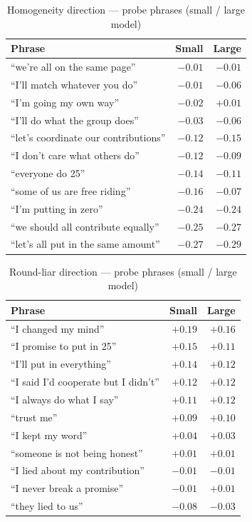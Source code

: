 \documentclass[11pt,oneside]{article}
\begin{document}
\begin{table}[H]
\centering
\caption{Homogeneity direction --- probe phrases (small / large model)}
\label{tab:probe_homog}
\footnotesize
\begin{tabular}{lrr}
\toprule
Phrase & Small & Large \\
\midrule
``we're all on the same page'' & $-0.01$ & $-0.01$ \\
``I'll match whatever you do'' & $-0.01$ & $-0.06$ \\
``I'm going my own way'' & $-0.02$ & $+0.01$ \\
``I'll do what the group does'' & $-0.03$ & $-0.06$ \\
``let's coordinate our contributions'' & $-0.12$ & $-0.15$ \\
``I don't care what others do'' & $-0.12$ & $-0.09$ \\
``everyone do 25'' & $-0.14$ & $-0.11$ \\
``some of us are free riding'' & $-0.16$ & $-0.07$ \\
``I'm putting in zero'' & $-0.24$ & $-0.24$ \\
``we should all contribute equally'' & $-0.25$ & $-0.27$ \\
``let's all put in the same amount'' & $-0.27$ & $-0.29$ \\
\bottomrule
\end{tabular}
\end{table}

\begin{table}[H]
\centering
\caption{Round-liar direction --- probe phrases (small / large model)}
\label{tab:probe_rliar}
\footnotesize
\begin{tabular}{lrr}
\toprule
Phrase & Small & Large \\
\midrule
``I changed my mind'' & $+0.19$ & $+0.16$ \\
``I promise to put in 25'' & $+0.15$ & $+0.11$ \\
``I'll put in everything'' & $+0.14$ & $+0.12$ \\
``I said I'd cooperate but I didn't'' & $+0.12$ & $+0.12$ \\
``I always do what I say'' & $+0.11$ & $+0.12$ \\
``trust me'' & $+0.09$ & $+0.10$ \\
``I kept my word'' & $+0.04$ & $+0.03$ \\
``someone is not being honest'' & $+0.01$ & $+0.01$ \\
``I lied about my contribution'' & $-0.01$ & $-0.01$ \\
``I never break a promise'' & $-0.01$ & $+0.01$ \\
``they lied to us'' & $-0.08$ & $-0.03$ \\
\bottomrule
\end{tabular}
\end{table}
\end{document}
